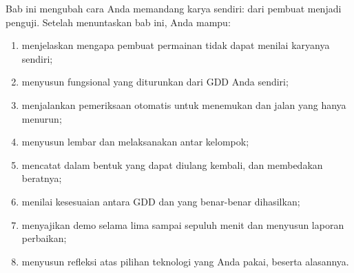 \begin{tujuanbox}
Bab ini mengubah cara Anda memandang karya sendiri: dari pembuat menjadi
penguji. Setelah menuntaskan bab ini, Anda mampu:
\begin{enumerate}
  \item menjelaskan mengapa pembuat permainan tidak dapat menilai karyanya
        sendiri;
  \item menyusun  fungsional yang diturunkan dari GDD
        Anda sendiri;
  \item menjalankan pemeriksaan otomatis untuk menemukan 
        dan jalan yang hanya menurun;
  \item menyusun lembar  dan melaksanakan
         antar kelompok;
  \item mencatat  dalam bentuk yang dapat diulang kembali, dan
        membedakan beratnya;
  \item menilai kesesuaian antara GDD dan  yang benar-benar
        dihasilkan;
  \item menyajikan demo selama lima sampai sepuluh menit dan menyusun laporan
        perbaikan;
  \item menyusun refleksi atas pilihan teknologi yang Anda pakai, beserta
        alasannya.
\end{enumerate}
\end{tujuanbox}
